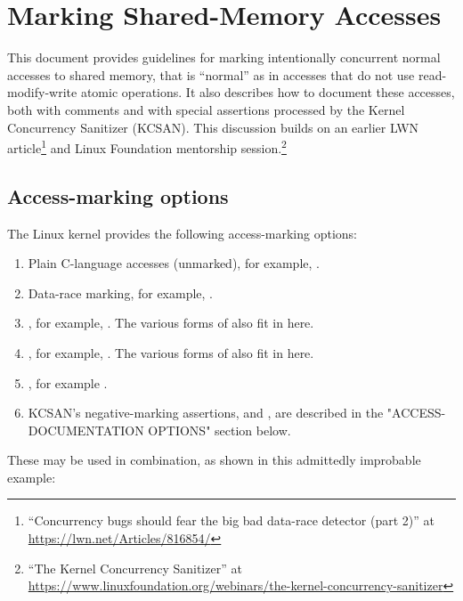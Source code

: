 \chapter{Marking Shared-Memory Accesses}

This document provides guidelines for marking intentionally concurrent
normal accesses to shared memory, that is ``normal'' as in accesses that do
not use read-modify-write atomic operations.
It also describes how to document these accesses, both with comments and
with special assertions processed by the Kernel Concurrency Sanitizer (KCSAN).
This discussion builds on an earlier LWN article\footnote{
``Concurrency bugs should fear the big bad data-race detector (part 2)'' at
\url{https://lwn.net/Articles/816854/}
} and Linux Foundation mentorship session.\footnote{
``The Kernel Concurrency Sanitizer'' at
\url{https://www.linuxfoundation.org/webinars/the-kernel-concurrency-sanitizer}
}

\section{Access-marking options}

The Linux kernel provides the following access-marking options:

\begin{enumerate}
\item	Plain C-language accesses (unmarked), for example, .

\item	Data-race marking, for example, .

\item	{}, for example, .
	The various forms of  also fit in here.

\item	{}, for example, .
	The various forms of  also fit in here.

\item	{}, for example .

\item	KCSAN's negative-marking assertions, 
	and , are described in the
	"ACCESS-DOCUMENTATION OPTIONS" section below.
\end{enumerate}

These may be used in combination, as shown in this admittedly improbable
example:

